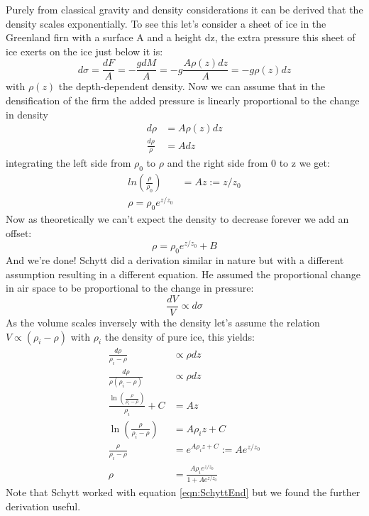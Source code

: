 \documentclass[11pt,a4paper,faculty=we,language=en,doctype=report]{cls/ugent-doc}
\begin{document}
Purely from classical gravity and density considerations it can be derived that
the density scales exponentially. To see this let's consider a sheet of ice in
the Greenland firn with a surface A and a height dz, the extra pressure this
sheet of ice exerts on the ice just below it is:
\begin{equation}
	d\sigma = \frac{dF}{A} = -\frac{gdM}{A} = -g\frac{A\rho(z)dz}{A} = -g\rho(z)dz
\end{equation}
with $\rho(z)$ the depth-dependent density. Now we can assume that in the
densification of the firm the added pressure is linearly proportional to the
change in density
\begin{align}
	d\rho &= A\rho(z)dz\\
	\frac{d\rho}{\rho} &= Adz
\end{align}
integrating the left side from $\rho_0$ to $\rho$ and the right side from 0 to z we get:
\begin{align}
ln\left(\frac{\rho}{\rho_0}\right) &= Az := z/z_0\\
	\rho = \rho_0 e^{z/z_0}
\end{align}
Now as theoretically we can't expect the density to decrease forever we add an offset:
\begin{equation}
	\label{eqn:myderiexp}
	\rho = \rho_0 e^{z/z_0} + B
\end{equation}
And we're done! Schytt did a derivation similar in nature but with a different
assumption resulting in a different equation. He assumed the proportional
change in air space to be proportional to the change in pressure:
\begin{equation}
	\frac{dV}{V} \propto d\sigma
\end{equation}
As the volume scales inversely with the density let's assume the relation $V \propto (\rho_i - \rho)$ with
$\rho_i$ the density of pure ice, this yields\cite{herron_langway_1980}:
\begin{align}
	\frac{d\rho}{\rho_i - \rho} &\propto \rho dz\\
	\frac{d\rho}{\rho(\rho_i - \rho)} &\propto \rho dz \label{eqn:SchyttEnd}\\
	\frac{\ln\left(\frac{\rho}{\rho_i-\rho}\right)}{\rho_i} + C &= Az\\
	\ln\left(\frac{\rho}{\rho_i-\rho}\right) &= A\rho_iz + C\\
	\frac{\rho}{\rho_i-\rho} &= e^{A\rho_iz + C} := Ae^{z/z_0}\\
	\rho &= \frac{A\rho_i e^{z/z_0}}{1 + Ae^{z/z_0}}
\end{align}
Note that Schytt worked with equation \ref{eqn:SchyttEnd} but we found
the further derivation useful.
\end{document}
